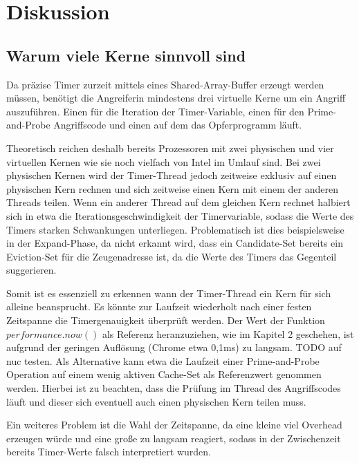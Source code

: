 \chapter{Diskussion}
\label{chapter:discussion}


\section{Warum viele Kerne sinnvoll sind}
Da präzise Timer zurzeit mittels eines Shared-Array-Buffer erzeugt werden müssen, benötigt die Angreiferin mindestens drei virtuelle Kerne um ein Angriff auszuführen. Einen für die Iteration der Timer-Variable, einen für den Prime-and-Probe Angriffscode und einen auf dem das Opferprogramm läuft.

Theoretisch reichen deshalb bereits Prozessoren mit zwei physischen und vier virtuellen Kernen wie sie noch vielfach von Intel im Umlauf sind. Bei zwei physischen Kernen wird der Timer-Thread jedoch zeitweise exklusiv auf einen physischen Kern rechnen und sich zeitweise einen Kern mit einem der anderen Threads teilen.
Wenn ein anderer Thread auf dem gleichen Kern rechnet halbiert sich in etwa die Iterationsgeschwindigkeit der Timervariable, sodass die Werte des Timers starken Schwankungen unterliegen.
Problematisch ist dies beispielsweise in der Expand-Phase, da nicht erkannt wird, dass ein Candidate-Set bereits ein Eviction-Set für die Zeugenadresse ist, da die Werte des Timers das Gegenteil suggerieren.

Somit ist es essenziell zu erkennen wann der Timer-Thread ein Kern für sich alleine beansprucht.
Es könnte zur Laufzeit wiederholt nach einer festen Zeitspanne die Timergenauigkeit überprüft werden.
Der Wert der Funktion $performance.now()$ als Referenz heranzuziehen, wie im Kapitel 2 geschehen, ist aufgrund der geringen Auflösung (Chrome etwa 0,1ms) zu langsam.
TODO auf nuc testen.
Als Alternative kann etwa die Laufzeit einer Prime-and-Probe Operation auf einem wenig aktiven Cache-Set als Referenzwert genommen werden.
Hierbei ist zu beachten, dass die Prüfung im Thread des Angriffscodes läuft und dieser sich eventuell auch einen physischen Kern teilen muss.

Ein weiteres Problem ist die Wahl der Zeitspanne, da eine kleine viel Overhead erzeugen würde und eine große zu langsam reagiert, sodass in der Zwischenzeit bereits Timer-Werte falsch interpretiert wurden.

